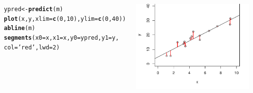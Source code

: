 \documentclass{beamer}\usepackage[]{graphicx}\usepackage[]{color}
\makeatletter
\newcommand{\hlnum}[1]{\textcolor[rgb]{0.686,0.059,0.569}{#1}}%
\newcommand{\hlstr}[1]{\textcolor[rgb]{0.192,0.494,0.8}{#1}}%
\newcommand{\hlstd}[1]{\textcolor[rgb]{0.345,0.345,0.345}{#1}}%
\newcommand{\hlkwb}[1]{\textcolor[rgb]{0.69,0.353,0.396}{#1}}%
\newcommand{\hlkwc}[1]{\textcolor[rgb]{0.333,0.667,0.333}{#1}}%
\newcommand{\hlkwd}[1]{\textcolor[rgb]{0.737,0.353,0.396}{\textbf{#1}}}%
\newenvironment{kframe}{%
 \def\at@end@of@kframe{}%
 \ifinner\ifhmode%
  \def\at@end@of@kframe{\end{minipage}}%
  \begin{minipage}{\columnwidth}%
 \fi\fi%
 \def\FrameCommand##1{\hskip\@totalleftmargin \hskip-\fboxsep
 \colorbox{shadecolor}{##1}\hskip-\fboxsep
     \hskip-\linewidth \hskip-\@totalleftmargin \hskip\columnwidth}%
 \MakeFramed {\advance\hsize-\width
   \@totalleftmargin\z@ \linewidth\hsize
   \@setminipage}}%
 {\par\unskip\endMakeFramed%
 \at@end@of@kframe}
\newenvironment{knitrout}{}{} %
\renewenvironment{knitrout}{\setlength{\topsep}{0mm}}{}
\makeatother
\begin{document}
\begin{frame}[fragile]
\begin{columns}[t]
\begin{knitrout}\tiny
{}\color{fgcolor}\begin{kframe}
\begin{alltt}
\hlstd{ypred} \hlkwb{<-} \hlkwd{predict}\hlstd{(m)}
\hlkwd{plot}\hlstd{(x,y,}\hlkwc{xlim}\hlstd{=}\hlkwd{c}\hlstd{(}\hlnum{0}\hlstd{,}\hlnum{10}\hlstd{),}\hlkwc{ylim}\hlstd{=}\hlkwd{c}\hlstd{(}\hlnum{0}\hlstd{,}\hlnum{40}\hlstd{))}
\hlkwd{abline}\hlstd{(m)}
\hlkwd{segments}\hlstd{(}\hlkwc{x0}\hlstd{=x,} \hlkwc{x1}\hlstd{=x,}\hlkwc{y0}\hlstd{=ypred,}\hlkwc{y1}\hlstd{=y,}
         \hlkwc{col}\hlstd{=}\hlstr{'red'}\hlstd{,}\hlkwc{lwd}\hlstd{=}\hlnum{2}\hlstd{)}
\end{alltt}
\end{kframe}
\includegraphics[width=1\linewidth]{figure/esd3plot-1} 

\end{knitrout}

\end{columns}

\end{frame}
\end{document}
